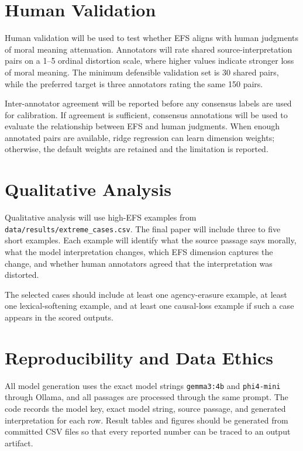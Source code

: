 \documentclass[10pt, conference]{IEEEtran}
\begin{document}
\section{Human Validation} \label{sec:human_validation}

Human validation will be used to test whether EFS aligns with human judgments of moral meaning attenuation. Annotators will rate shared source-interpretation pairs on a 1--5 ordinal distortion scale, where higher values indicate stronger loss of moral meaning. The minimum defensible validation set is 30 shared pairs, while the preferred target is three annotators rating the same 150 pairs.

Inter-annotator agreement will be reported before any consensus labels are used for calibration. If agreement is sufficient, consensus annotations will be used to evaluate the relationship between EFS and human judgments. When enough annotated pairs are available, ridge regression can learn dimension weights; otherwise, the default weights are retained and the limitation is reported.

\section{Qualitative Analysis} \label{sec:qualitative}

Qualitative analysis will use high-EFS examples from \texttt{data/results/extreme\_cases.csv}. The final paper will include three to five short examples. Each example will identify what the source passage says morally, what the model interpretation changes, which EFS dimension captures the change, and whether human annotators agreed that the interpretation was distorted.

The selected cases should include at least one agency-erasure example, at least one lexical-softening example, and at least one causal-loss example if such a case appears in the scored outputs.

\section{Reproducibility and Data Ethics} \label{sec:repro_ethics}

All model generation uses the exact model strings \texttt{gemma3:4b} and \texttt{phi4-mini} through Ollama, and all passages are processed through the same prompt. The code records the model key, exact model string, source passage, and generated interpretation for each row. Result tables and figures should be generated from committed CSV files so that every reported number can be traced to an output artifact.
\end{document}
